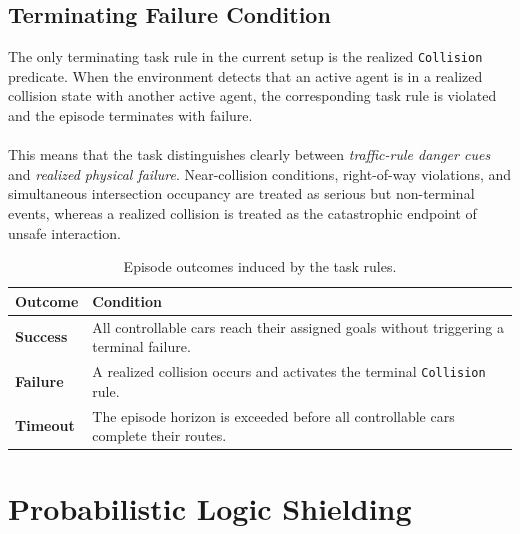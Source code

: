 \subsection{Terminating Failure Condition}
The only terminating task rule in the current setup is the realized \texttt{Collision} predicate. When the environment detects that an active agent is in a realized collision state with another active agent, the corresponding task rule is violated and the episode terminates with failure.
\\
\\
This means that the task distinguishes clearly between \emph{traffic-rule danger cues} and \emph{realized physical failure}. Near-collision conditions, right-of-way violations, and simultaneous intersection occupancy are treated as serious but non-terminal events, whereas a realized collision is treated as the catastrophic endpoint of unsafe interaction.

\begin{table}[H]
\centering
\small
\caption{Episode outcomes induced by the task rules.}
\label{tab:task-rule-outcomes}
\begin{tabularx}{\linewidth}{@{}l X@{}}
\toprule
\textbf{Outcome} & \textbf{Condition} \\
\midrule
\textbf{Success} & All controllable cars reach their assigned goals without triggering a terminal failure. \\
\textbf{Failure} & A realized collision occurs and activates the terminal \texttt{Collision} rule. \\
\textbf{Timeout} & The episode horizon is exceeded before all controllable cars complete their routes. \\
\bottomrule
\end{tabularx}
\end{table}

\section{Probabilistic Logic Shielding}
